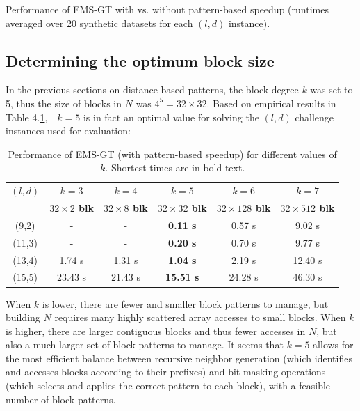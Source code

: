 \documentclass[oneside,12pt]{DISCSthesis}
\begin{document}
{\begin{table}[h]
			\caption{\small Performance of EMS-GT with vs. without pattern-based speedup
			(runtimes averaged over 20 synthetic datasets for each $(l,d)$ instance).}
			\end{table}

		\subsection{Determining the optimum block size}
			In the previous sections on distance-based patterns, the block degree $k$ was set to 5, thus the size of blocks in $N$ was $4^5 = 32 \times 32$. Based on empirical results in Table 4.\ref{tbl:block-degree-tests},\ \ $k=5$ is in fact an optimal value for solving the $(l,d)$ challenge instances used for evaluation:\newline

			\begin{table}[h] %
				\small
				\renewcommand{\arraystretch}{1.3}
				\label{tbl:block-degree-tests}
				\centering
				\begin{tabular}{|c|c|c|c|c|c|}
				\hline
				\bfseries\boldmath $(l,d)$ &
				\bfseries\boldmath $k=3$ &
				\bfseries\boldmath $k=4$ &
				\bfseries\boldmath $k=5$ &
				\bfseries\boldmath $k=6$ &
				\bfseries\boldmath $k=7$ \\

				\bfseries &
				\bfseries\boldmath $32 \times   2$ blk &
				\bfseries\boldmath $32 \times   8$ blk &
				\bfseries\boldmath $32 \times  32$ blk &
				\bfseries\boldmath $32 \times 128$ blk &
				\bfseries\boldmath $32 \times 512$ blk \\
				\hline
				 (9,2) 	&    -   &    -     & {\bf  0.11 s} &  0.57 s &  9.02 s \\
				(11,3) 	&    -   &    -     & {\bf  0.20 s} &  0.70 s &  9.77 s \\
				(13,4) 	&  1.74 s &  1.31 s & {\bf  1.04 s} &  2.19 s & 12.40 s \\
				(15,5) 	& 23.43 s & 21.43 s & {\bf 15.51 s} & 24.28 s & 46.30 s \\
				\hline
				\end{tabular}
				\centering
				\caption{\small Performance of EMS-GT (with pattern-based speedup) for different values of $k$. Shortest times are in bold text.}
				\end{table}

			When $k$ is lower, there are fewer and smaller block patterns to manage, but building $N$ requires many highly scattered array accesses to small blocks. When $k$ is higher, there are larger contiguous blocks and thus fewer accesses in $N$, but also a much larger set of block patterns to manage. It seems that $k=5$ allows for the most efficient balance between recursive neighbor generation (which identifies and accesses blocks according to their prefixes) and bit-masking operations (which selects and applies the correct pattern to each block), with a feasible number of block patterns. 

}
\end{document}

